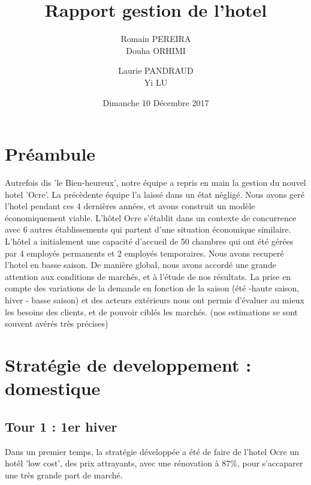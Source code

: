 \documentclass[a4paper,10pt]{article}
\title{Rapport gestion de l'hotel}
\author{
  Romain PEREIRA\\
  \newline
  Douha ORHIMI\\
  \and
  Laurie PANDRAUD\\
  \newline
  Yi LU\\
}
\date{Dimanche 10 Décembre 2017}
\begin{document}
\maketitle
\tableofcontents
  \section{Préambule}
    Autrefois dis 'le Bien-heureux', notre équipe a repris en main la gestion du nouvel hotel 'Ocre'. La précèdente équipe l'a laissé dans un état négligé.
    Nous avons geré l'hotel pendant ces 4 dernières années, et avons construit un modèle économiquement viable.
    \newline
    \newline
    L’hôtel Ocre s’établit dans un contexte de concurrence avec 6 autres établissements qui partent d’une situation économique similaire.
    L’hôtel a initialement une capacité d’accueil de 50 chambres qui ont été gérées par 4 employés permanents et 2 employés temporaires.
    Nous avons recuperé l'hotel en basse saison.
    \newline
    \newline
    De manière global, nous avons accordé une grande attention aux conditions de marchés, et à l'étude de nos résultats.
    La prise en compte des variations de la demande en fonction de la saison
    (été -haute saison, hiver - basse saison) et des acteurs extérieurs nous ont permis d’évaluer
    au mieux les besoins des clients, et de pouvoir ciblés les marchés. (nos estimations se sont souvent avérés très précises)
  \newpage
  \section{Stratégie de developpement : domestique}
    \subsection{Tour 1 : 1er hiver}      
      Dans un premier temps, la stratégie développée a été de faire de l’hotel Ocre un hotêl 'low cost',
      des prix attrayants, avec une rénovation à 87\%, pour s’accaparer une très grande part de marché.
      
      
\end{document}
